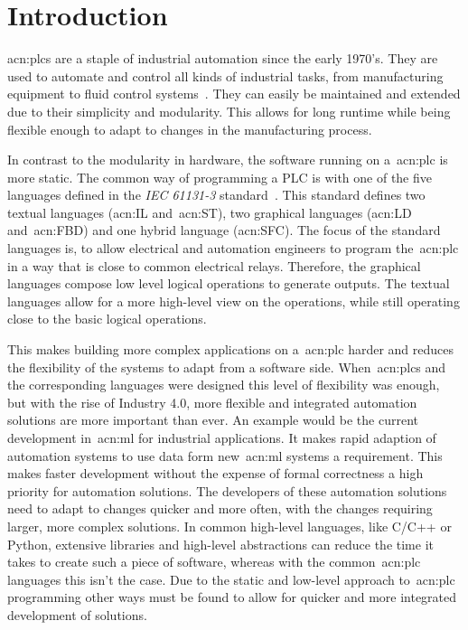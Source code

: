 
\section{Introduction}
\label{sec:Introduction}

\glspl{acn:plc} are a staple of industrial automation since the early 1970's.
They are used to automate and control all kinds of industrial tasks, from manufacturing equipment to fluid control systems~\cite{Erickson:1996aa}.
They can easily be maintained and extended due to their simplicity and modularity.
This allows for long runtime while being flexible enough to adapt to changes in the manufacturing process.

In contrast to the modularity in hardware, the software running on a~\gls{acn:plc} is more static.
The common way of programming a PLC is with one of the five languages defined in the \textit{IEC 61131-3} standard~\cite{Plcopen:61131-3}.
This standard defines two textual languages (\gls{acn:IL} and~\gls{acn:ST}), two graphical languages (\gls{acn:LD} and~\gls{acn:FBD}) and one hybrid language (\gls{acn:SFC}).
The focus of the standard languages is, to allow electrical and automation engineers to program the~\gls{acn:plc} in a way that is close to common electrical relays.
Therefore, the graphical languages compose low level logical operations to generate outputs.
The textual languages allow for a more high-level view on the operations, while still operating close to the basic logical operations.

This makes building more complex applications on a~\gls{acn:plc} harder and reduces the flexibility of the systems to adapt from a software side.
When~\glspl{acn:plc} and the corresponding languages were designed this level of flexibility was enough, but with the rise of Industry 4.0, more flexible and integrated automation solutions are more important than ever.
An example would be the current development in~\gls{acn:ml} for industrial applications.
It makes rapid adaption of automation systems to use data form new~\acrshort{acn:ml} systems a requirement.
This makes faster development without the expense of formal correctness a high priority for automation solutions.
The developers of these automation solutions need to adapt to changes quicker and more often, with the changes requiring larger, more complex solutions.
In common high-level languages, like C/C++ or Python, extensive libraries and high-level abstractions can reduce the time it takes to create such a piece of software, whereas with the common~\gls{acn:plc} languages this isn't the case.
Due to the static and low-level approach to~\gls{acn:plc} programming other ways must be found to allow for quicker and more integrated development of solutions.
